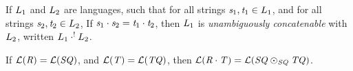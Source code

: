 \documentclass[numbers,10pt,preprint\ifanon ,nocopyrightspace\fi]{sigplanconf}
\begin{document}
\begin{definition}
  If $L_1$ and $L_2$ are languages, such that
  for all strings $\mathit{s}_1,\mathit{t}_1 \in L_1$, and for all strings
  $\mathit{s}_2,\mathit{t}_2 \in L_2$, If $\mathit{s}_1\cdot\mathit{s}_2 =
  \mathit{t}_1\cdot\mathit{t}_2$, then $L_1$ is \textit{unambiguously
    concatenable} with $L_2$, written
  $L_1 \cdot^! L_2$.
\end{definition}


\begin{lemma}
  If $\mathcal{L}(\mathit{R})=\mathcal{L}(\mathit{SQ})$,
  and $\mathcal{L}(\mathit{T})=\mathcal{L}(\mathit{TQ})$,
  then $\mathcal{L}(\mathit{R}\cdot\mathit{T})=\mathcal{L}(\mathit{SQ}\odot_{\mathit{SQ}}\mathit{TQ})$.
\end{lemma}
\end{document}
